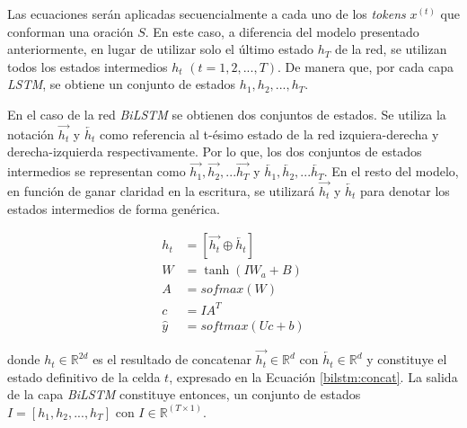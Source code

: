 Las ecuaciones serán aplicadas secuencialmente a cada uno de los \textit{tokens} $x^{(t)}$ que conforman una oración $S$. En este caso, a diferencia del modelo presentado anteriormente, en lugar de utilizar solo el último estado $h_{T}$ de la red, se utilizan todos los estados intermedios $h_{t}$  $(t = 1, 2, ..., T)$. De manera que, por cada capa \textit{LSTM}, se obtiene un conjunto de estados $h_{1}, h_{2}, ..., h_{T}$.

En el caso de la red \textit{BiLSTM} se obtienen dos conjuntos de estados. Se utiliza la notación $\overrightarrow{h_{t}}$ y $\overleftarrow{h_{t}}$ como referencia al t-ésimo estado de la red izquiera-derecha y derecha-izquierda respectivamente. Por lo que, los dos conjuntos de estados intermedios se representan como $\overrightarrow{h_{1}}, \overrightarrow{h_{2}}, ... \overrightarrow{h_{T}}$ y $\overleftarrow{h_{1}}, \overleftarrow{h_{2}}, ... \overleftarrow{h_{T}}$. En el resto del modelo, en función de ganar claridad en la escritura, se utilizará $\overrightarrow{h_{t}}$ y  $\overleftarrow{h_{t}}$ para denotar los estados intermedios de forma genérica.

\begin{align}
  h_{t} &= [\overrightarrow{h_{t}} \oplus \overleftarrow{h_{t}}] \label{bilstm:concat} \\
  W &= \tanh{(IW_{a} + B)} \label{bilstm:dense} \\
  A &= sofmax(W) \label{bilstm:sig} \\
  c &= IA^{T} \label{bilstm:dot} \\
  \hat{y} &= softmax(Uc + b) \label{bilstm:pred}
\end{align}

donde $h_{t} \in {\mathbb{R}} ^{2d}$ es el resultado de concatenar $\overrightarrow{h_{t}} \in {\mathbb{R}} ^{d}$ con $\overleftarrow{h_{t}} \in {\mathbb{R}} ^{d}$ y constituye el estado definitivo de la celda $t$, expresado en la Ecuación \ref{bilstm:concat}. La salida de la capa \textit{BiLSTM} constituye entonces, un conjunto de estados $I  = {[h_{1}, h_{2}, ..., h_{T}]}$ con $I \in {\mathbb{R}}^{(T \times 1)}$.

